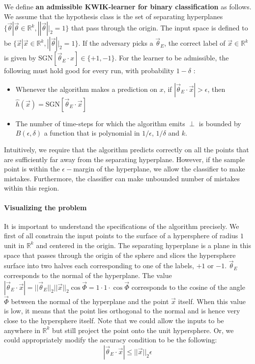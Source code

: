 \begin{dfn} 
\label{defn:kwik_classifier}
We define \textbf{an admissible KWIK-learner for binary classification} as follows. We assume that the hypothesis class is the set of separating hyperplanes $\{\vec{\theta} | \vec{\theta} \in \mathbb{R}^k, ||\vec{\theta}||_2 =  1\}$ that pass through the origin.
The input space is defined to be $\{\vec{x} | \vec{x} \in \mathbb{R}^k, ||\vec{\theta}||_2 = 1\}$.
 If the adversary picks a $\vec{\theta}_E$, the correct label of $\vec{x} \in \mathbb{R}^k$ is given by $\text{SGN}[\vec{\theta}_E \cdot x] \in \{+1, -1\}$. For the learner to be admissible, the following must hold good for every run, with probability $1-\delta$ : 
\begin{itemize}
\item Whenever the algorithm makes a prediction on $x$, if $|\vec{\theta}_E \cdot \vec{x}| > \epsilon$, then $\hat{h}(\vec{x}) = \text{SGN}[\vec{\theta}_E \cdot \vec{x}]$
\item The number of time-steps for which the algorithm emits $\perp$ is bounded by $B(\epsilon,\delta)$ a function that is polynomial in $1/\epsilon$, $1/\delta$ and $k$.
\end{itemize}
\end{dfn}

Intuitively, we require that the algorithm predicts correctly on all the points that are sufficiently far away from the separating hyperplane. However, if the sample point is within the $\epsilon-$margin of the hyperplane, we allow the classifier to make mistakes. Furthermore, the classifier can make unbounded number of mistakes within this region.

\paragraph{Visualizing the problem} It is important to understand the specifications of the algorithm precisely. We first of all constrain the input points to the surface of a hypersphere of radius $1$ unit in $\mathbb{R}^k$ and centered in the origin. The separating hyperplane is a plane in this space that passes through the origin of the sphere and slices the hypersphere surface into two halves each corresponding to one of the labels, $+1$ or $-1$. $\vec{\theta}_E$ corresponds to the normal of the hyperplane. The value $|\vec{\theta}_E \cdot \vec{x}| = ||\vec{\theta}_E||_2 ||\vec{x} ||_2 \cos\vec{\Phi} = 1 \cdot 1 \cdot \cos \vec{\Phi}  $ corresponds to the cosine of the angle $\vec{\Phi}$ between the normal of the hyperplane and the point $\vec{x}$ itself. When this value is low, it means that the point lies orthogonal to the normal and is hence very close to the hypersphere itself. 
Note that we could allow the inputs to be anywhere in $\mathbb{R}^k$ but still project the point onto the unit hypersphere. Or, we could appropriately modify the accuracy condition to be the following:
\begin{equation}
 |\vec{\theta}_E \cdot \vec{x}| \leq ||\vec{x}||_2 \epsilon
\end{equation}

